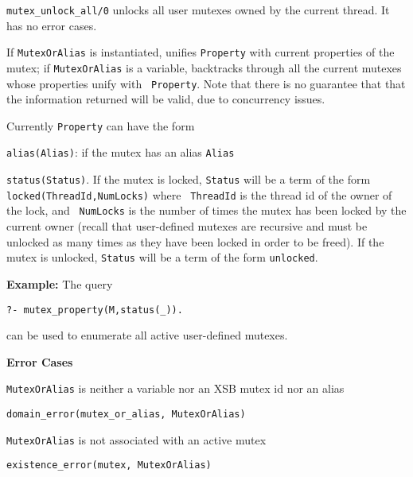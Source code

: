 \begin{description}
%
{\tt mutex\_unlock\_all/0} unlocks all user mutexes owned by the
current thread.  It has no error cases.

%
If {\tt MutexOrAlias} is instantiated, unifies {\tt Property} with current
properties of the mutex; if {\tt MutexOrAlias} is a variable, backtracks
through all the current mutexes whose properties unify with {\tt
  Property}.  Note that there is no guarantee that that the
information returned will be valid, due to concurrency issues.

Currently {\tt Property} can have the form 
\bi
\item {\tt alias(Alias)}: if the mutex has an alias {\tt Alias}
%
\item {\tt status(Status)}.  If the mutex is locked, {\tt Status} will
  be a term of the form {\tt locked(ThreadId,NumLocks)} where {\tt
    ThreadId} is the thread id of the owner of the lock, and {\tt
    NumLocks} is the number of times the mutex has been locked by the
  current owner (recall that user-defined mutexes are recursive and
  must be unlocked as many times as they have been locked in order to
  be freed).  If the mutex is unlocked, {\tt Status} will be a term
  of the form {\tt unlocked}.  \ei

{\bf Example:} The query
\begin{verbatim}
?- mutex_property(M,status(_)).
\end{verbatim}
can be used to enumerate all active user-defined mutexes.

{\bf Error Cases}
%
\bi
\item {\tt MutexOrAlias} is neither a variable nor an XSB mutex id
  nor an alias
\bi
\item {\tt domain\_error(mutex\_or\_alias, MutexOrAlias)}
\ei
\item {\tt MutexOrAlias} is not associated with an active mutex
\bi
\item {\tt existence\_error(mutex, MutexOrAlias)}
\ei
\ei

\end{description}


